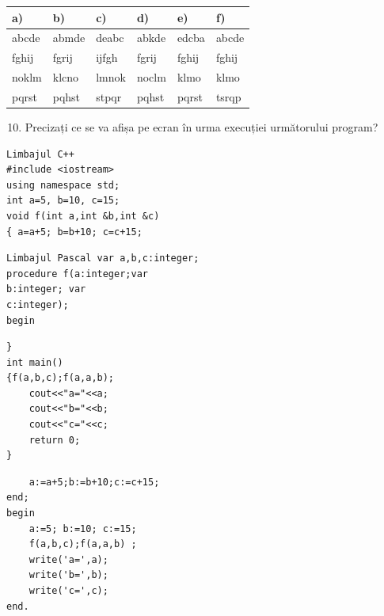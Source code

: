 \documentclass[10pt]{article}
\begin{document}
\begin{center}
\begin{tabular}{|l|l|l|l|l|l|}
\hline
a) & b) & c) & d) & e) & f) \\
\hline
abcde & abmde & deabc & abkde & edcba & abcde \\
\hline
fghij & fgrij & ijfgh & fgrij & fghij & fghij \\
\hline
noklm & klcno & lmnok & noclm & klmo & klmo \\
\hline
pqrst & pqhst & stpqr & pqhst & pqrst & tsrqp \\
\hline
\end{tabular}
\end{center}

\begin{enumerate}
  \setcounter{enumi}{9}
  \item Precizați ce se va afișa pe ecran în urma execuției următorului program?
\end{enumerate}

\begin{verbatim}
Limbajul C++
#include <iostream>
using namespace std;
int a=5, b=10, c=15;
void f(int a,int &b,int &c)
{ a=a+5; b=b+10; c=c+15;
\end{verbatim}

\begin{verbatim}
Limbajul Pascal var a,b,c:integer;
procedure f(a:integer;var
b:integer; var
c:integer);
begin
\end{verbatim}

\begin{verbatim}
}
int main()
{f(a,b,c);f(a,a,b);
    cout<<"a="<<a;
    cout<<"b="<<b;
    cout<<"c="<<c;
    return 0;
}
\end{verbatim}

\begin{verbatim}
    a:=a+5;b:=b+10;c:=c+15;
end;
begin
    a:=5; b:=10; c:=15;
    f(a,b,c);f(a,a,b) ;
    write('a=',a);
    write('b=',b);
    write('c=',c);
end.
\end{verbatim}
\end{document}
